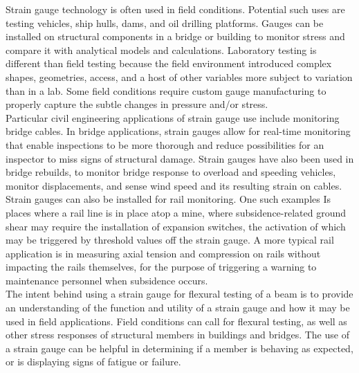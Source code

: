 \documentclass{article}
\begin{document}
    \indent Strain gauge technology is often used in field conditions. Potential such uses are testing vehicles, ship hulls, dams, and oil drilling platforms. Gauges can be installed on structural components in a bridge or building to monitor stress and compare it with analytical models and calculations. Laboratory testing is different than field testing because the field environment introduced complex shapes, geometries, access, and a host of other variables more subject to variation than in a lab. Some field conditions require custom gauge manufacturing to properly capture the subtle changes in pressure and/or stress. \\
    \indent Particular civil engineering applications of strain gauge use include monitoring bridge cables. In bridge applications, strain gauges allow for real-time monitoring that enable inspections to be more thorough and reduce possibilities for an inspector to miss signs of structural damage. Strain gauges have also been used in bridge rebuilds, to monitor bridge response to overload and speeding vehicles, monitor displacements, and sense wind speed and its resulting strain on cables. \\
    \indent Strain gauges can also be installed for rail monitoring. One such examples Is places where a rail line is in place atop a mine, where subsidence-related ground shear may require the installation of expansion switches, the activation of which may be triggered by threshold values off the strain gauge. A more typical rail application is in measuring axial tension and compression on rails without impacting the rails themselves, for the purpose of triggering a warning to maintenance personnel when subsidence occurs. \\
    \indent The intent behind using a strain gauge for flexural testing of a beam is to provide an understanding of the function and utility of a strain gauge and how it may be used in field applications. Field conditions can call for flexural testing, as well as other stress responses of structural members in buildings and bridges. The use of a strain gauge can be helpful in determining if a member is behaving as expected, or is displaying signs of fatigue or failure. 
    \newpage
\end{document}

